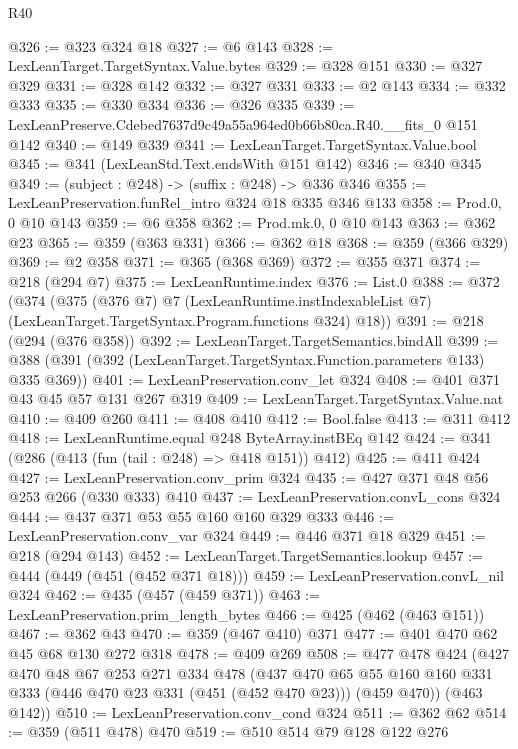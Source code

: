 \begin{lexlean}{R40}
\begin{coremodule}
@326 := @323 @324 @18
@327 := @6 @143
@328 := LexLeanTarget.TargetSyntax.Value.bytes
@329 := @328 @151
@330 := @327 @329
@331 := @328 @142
@332 := @327 @331
@333 := @2 @143
@334 := @332 @333
@335 := @330 @334
@336 := @326 @335
@339 := LexLeanPreserve.Cdebed7637d9c49a55a964ed0b66b80ca.R40.__fits_0 @151 @142
@340 := @149 @339
@341 := LexLeanTarget.TargetSyntax.Value.bool
@345 := @341 (LexLeanStd.Text.endsWith @151 @142)
@346 := @340 @345
@349 := (subject : @248) -> (suffix : @248) -> @336 @346
@355 := LexLeanPreservation.funRel_intro @324 @18 @335 @346 @133
@358 := Prod.{0, 0} @10 @143
@359 := @6 @358
@362 := Prod.mk.{0, 0} @10 @143
@363 := @362 @23
@365 := @359 (@363 @331)
@366 := @362 @18
@368 := @359 (@366 @329)
@369 := @2 @358
@371 := @365 (@368 @369)
@372 := @355 @371
@374 := @218 (@294 @7)
@375 := LexLeanRuntime.index
@376 := List.{0}
@388 := @372
    (@374
      (@375
        (@376 @7)
        @7
        (LexLeanRuntime.instIndexableList @7)
        (LexLeanTarget.TargetSyntax.Program.functions @324)
        @18))
@391 := @218 (@294 (@376 @358))
@392 := LexLeanTarget.TargetSemantics.bindAll
@399 := @388 (@391 (@392 (LexLeanTarget.TargetSyntax.Function.parameters @133) @335 @369))
@401 := LexLeanPreservation.conv_let @324
@408 := @401 @371 @43 @45 @57 @131 @267 @319
@409 := LexLeanTarget.TargetSyntax.Value.nat
@410 := @409 @260
@411 := @408 @410
@412 := Bool.false
@413 := @311 @412
@418 := LexLeanRuntime.equal @248 ByteArray.instBEq @142
@424 := @341 (@286 (@413 (fun (tail : @248) => @418 @151)) @412)
@425 := @411 @424
@427 := LexLeanPreservation.conv_prim @324
@435 := @427 @371 @48 @56 @253 @266 (@330 @333) @410
@437 := LexLeanPreservation.convL_cons @324
@444 := @437 @371 @53 @55 @160 @160 @329 @333
@446 := LexLeanPreservation.conv_var @324
@449 := @446 @371 @18 @329
@451 := @218 (@294 @143)
@452 := LexLeanTarget.TargetSemantics.lookup
@457 := @444 (@449 (@451 (@452 @371 @18)))
@459 := LexLeanPreservation.convL_nil @324
@462 := @435 (@457 (@459 @371))
@463 := LexLeanPreservation.prim_length_bytes
@466 := @425 (@462 (@463 @151))
@467 := @362 @43
@470 := @359 (@467 @410) @371
@477 := @401 @470 @62 @45 @68 @130 @272 @318
@478 := @409 @269
@508 := @477
    @478
    @424
    (@427
      @470
      @48
      @67
      @253
      @271
      @334
      @478
      (@437
        @470
        @65
        @55
        @160
        @160
        @331
        @333
        (@446 @470 @23 @331 (@451 (@452 @470 @23)))
        (@459 @470))
      (@463 @142))
@510 := LexLeanPreservation.conv_cond @324
@511 := @362 @62
@514 := @359 (@511 @478) @470
@519 := @510 @514 @79 @128 @122 @276

\end{coremodule}
\end{lexlean}
